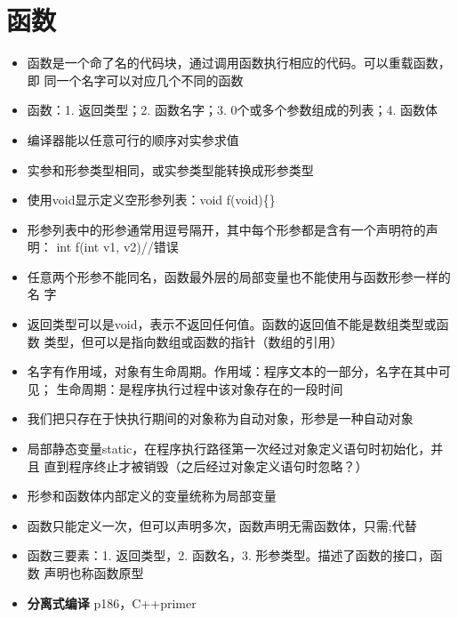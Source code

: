 \documentclass[11pt]{article}
\begin{document}
\section{函数}
\label{sec-4}
\begin{itemize}
\item 函数是一个命了名的代码块，通过调用函数执行相应的代码。可以重载函数，即
同一个名字可以对应几个不同的函数
\item 函数：1. 返回类型；2. 函数名字；3. 0个或多个参数组成的列表；4. 函数体
\item 编译器能以任意可行的顺序对实参求值
\item 实参和形参类型相同，或实参类型能转换成形参类型
\item 使用void显示定义空形参列表：void f(void)\{\}
\item 形参列表中的形参通常用逗号隔开，其中每个形参都是含有一个声明符的声明：
int f(int v1, v2)//错误
\item 任意两个形参不能同名，函数最外层的局部变量也不能使用与函数形参一样的名
字
\item 返回类型可以是void，表示不返回任何值。函数的返回值不能是数组类型或函数
类型，但可以是指向数组或函数的指针（数组的引用）
\item 名字有作用域，对象有生命周期。作用域：程序文本的一部分，名字在其中可见；
生命周期：是程序执行过程中该对象存在的一段时间
\item 我们把只存在于快执行期间的对象称为自动对象，形参是一种自动对象
\item 局部静态变量static，在程序执行路径第一次经过对象定义语句时初始化，并且
直到程序终止才被销毁（之后经过对象定义语句时忽略？）
\item 形参和函数体内部定义的变量统称为局部变量
\item 函数只能定义一次，但可以声明多次，函数声明无需函数体，只需;代替
\item 函数三要素：1. 返回类型，2. 函数名，3. 形参类型。描述了函数的接口，函数
声明也称函数原型
\item \textbf{分离式编译} p186，C++primer
\end{itemize}
\end{document}
